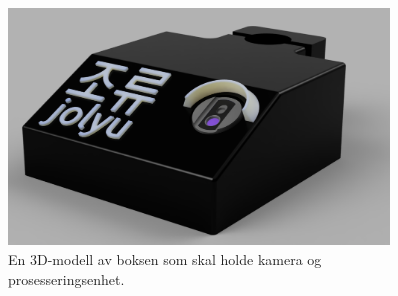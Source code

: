 \begin{figure}[H]
\centering
\begin{minipage}[c]{0.45\textwidth}
\centering
    \includegraphics[width=0.9\textwidth]{implementering/Boks_render.png}
    \caption{En 3D-modell av boksen som skal holde kamera og prosesseringsenhet.}
    \label{fig:boks}
    

\end{minipage}
\end{figure}
